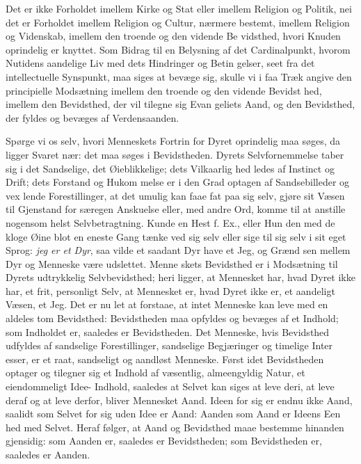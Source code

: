 \documentclass[12pt]{book}
\newcommand{\opage}[1]{\marginnote{\footnotesize\textit{[#1]}}}
\begin{document}
Det er ikke Forholdet imellem Kirke og Stat eller
imellem Religion og Politik, nei det er Forholdet imellem
Religion og Cultur, nærmere bestemt, imellem Religion
og Videnskab, imellem den troende og den vidende Be\-%
vidsthed, hvori Knuden oprindelig er knyttet. Som
Bidrag til en Belysning af det Cardinalpunkt, hvorom
Nutidens aandelige Liv med dets Hindringer og Betin\-%
gelser, seet fra det intellectuelle Synspunkt, maa siges
at bevæge sig, skulle vi i faa Træk angive den principielle
Modsætning imellem den troende og den vidende Bevidst\-%
hed, imellem den Bevidsthed, der vil tilegne sig Evan\-%
\opage{40}\setcounter{footnote}{0}%
geliets Aand, og den Bevidsthed, der fyldes og bevæges
af Verdensaanden.

Spørge vi os selv, hvori Menneskets Fortrin for
Dyret oprindelig maa søges, da ligger Svaret nær: det
maa søges i Bevidstheden. Dyrets Selvfornemmelse taber
sig i det Sandselige, det Øieblikkelige; dets Vilkaarlig\-%
hed ledes af Instinct og Drift; dets Forstand og Hukom\-%
melse er i den Grad optagen af Sandsebilleder og vex\-%
lende Forestillinger, at det umulig kan faae fat paa sig
selv, gjøre sit Væsen til Gjenstand for særegen Anskuelse
eller, med andre Ord, komme til at anstille nogensom\-%
helst Selvbetragtning. Kunde en Hest f. Ex., eller Hun\-%
den med de kloge Øine blot en eneste Gang tænke ved
sig selv eller sige til sig selv i sit eget Sprog: \textit{jeg er et
Dyr}, saa vilde et saadant Dyr have et Jeg, og Grænd\-%
sen mellem Dyr og Menneske være udslettet. Menne\-%
skets Bevidsthed er i Modsætning til Dyrets udtrykkelig
Selvbevidsthed; heri ligger, at Mennesket har, hvad Dyret
ikke har, et frit, personligt Selv, at Mennesket er, hvad
Dyret ikke er, et aandeligt Væsen, et Jeg. Det er nu
let at forstaae, at intet Menneske kan leve med en aldeles
tom Bevidsthed: Bevidstheden maa opfyldes og bevæges
af et Indhold; som Indholdet er, saaledes er Bevidstheden.
Det Menneske, hvis Bevidsthed udfyldes af sandselige
Forestillinger, sandselige Begjæringer og timelige Inter\-%
esser, er et raat, sandseligt og aandløst Menneske. Først
idet Bevidstheden optager og tilegner sig et Indhold af
væsentlig, almeengyldig Natur, et eiendommeligt Idee-%
Indhold, saaledes at Selvet kan siges at leve deri, at leve
deraf og at leve derfor, bliver Mennesket Aand. Ideen
for sig er endnu ikke Aand, saalidt som Selvet for sig
uden Idee er Aand: Aanden som Aand er Ideens Een\-%
hed med Selvet. Heraf følger, at Aand og Bevidsthed
maae bestemme hinanden gjensidig: som Aanden er,
\opage{41}\setcounter{footnote}{0}%
saaledes er Bevidstheden; som Bevidstheden er, saaledes
er Aanden.
\end{document}
